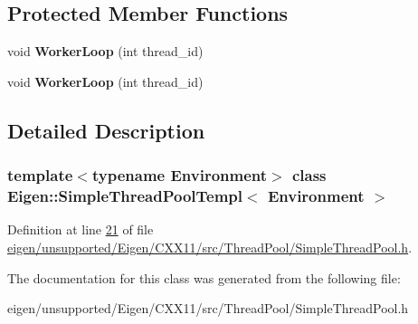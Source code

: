 \subsection*{Protected Member Functions}
\begin{DoxyCompactItemize}
\item 
\mbox{\label{class_eigen_1_1_simple_thread_pool_templ_a9a28d342ce15230d47c8f7cab681b8ac}} 
void {\bfseries Worker\+Loop} (int thread\+\_\+id)
\item 
\mbox{\label{class_eigen_1_1_simple_thread_pool_templ_a9a28d342ce15230d47c8f7cab681b8ac}} 
void {\bfseries Worker\+Loop} (int thread\+\_\+id)
\end{DoxyCompactItemize}


\subsection{Detailed Description}
\subsubsection*{template$<$typename Environment$>$\newline
class Eigen\+::\+Simple\+Thread\+Pool\+Templ$<$ Environment $>$}



Definition at line \hyperlink{eigen_2unsupported_2_eigen_2_c_x_x11_2src_2_thread_pool_2_simple_thread_pool_8h_source_l00021}{21} of file \hyperlink{eigen_2unsupported_2_eigen_2_c_x_x11_2src_2_thread_pool_2_simple_thread_pool_8h_source}{eigen/unsupported/\+Eigen/\+C\+X\+X11/src/\+Thread\+Pool/\+Simple\+Thread\+Pool.\+h}.



The documentation for this class was generated from the following file\+:\begin{DoxyCompactItemize}
\item 
eigen/unsupported/\+Eigen/\+C\+X\+X11/src/\+Thread\+Pool/\+Simple\+Thread\+Pool.\+h\end{DoxyCompactItemize}
